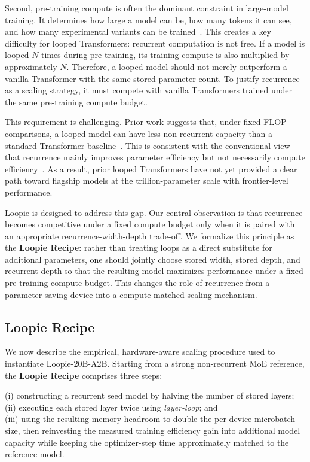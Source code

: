 Second, pre-training compute is often the dominant constraint in large-model training. It determines how large a model can be, how many tokens it can see, and how many experimental variants can be trained~\citep{kaplan2020scaling,hoffmann2022training}. This creates a key difficulty for looped Transformers: recurrent computation is not free. If a model is looped $N$ times during pre-training, its training compute is also multiplied by approximately $N$. Therefore, a looped model should not merely outperform a vanilla Transformer with the same stored parameter count. To justify recurrence as a scaling strategy, it must compete with vanilla Transformers trained under the same pre-training compute budget.

This requirement is challenging. Prior work suggests that, under fixed-FLOP comparisons, a looped model can have less non-recurrent capacity than a standard Transformer baseline~\citep{csordas2024moeut,frey2026dualpath}. This is consistent with the conventional view that recurrence mainly improves parameter efficiency but not necessarily compute efficiency~\citep{lan2019albert,takase2023lessons}. As a result, prior looped Transformers have not yet provided a clear path toward flagship models at the trillion-parameter scale with frontier-level performance.

Loopie is designed to address this gap. Our central observation is that recurrence becomes competitive under a fixed compute budget only when it is paired with an appropriate recurrence-width-depth trade-off. We formalize this principle as the \textbf{Loopie Recipe}: rather than treating loops as a direct substitute for additional parameters, one should jointly choose stored width, stored depth, and recurrent depth so that the resulting model maximizes performance under a fixed pre-training compute budget. This changes the role of recurrence from a parameter-saving device into a compute-matched scaling mechanism.

\subsection{Loopie Recipe}
\label{subsec:loopie-recipe}

We now describe the empirical, hardware-aware scaling procedure used to
instantiate Loopie-20B-A2B. Starting from a strong non-recurrent MoE
reference, the \textbf{Loopie Recipe} comprises three steps:
\begin{tcolorbox}[colback=blue!4,colframe=blue!35!black,boxrule=0.5pt,arc=4pt,left=6pt,right=6pt,top=5pt,bottom=5pt]
(i) constructing a recurrent seed model by halving the number of stored layers; \\
(ii) executing each stored layer twice using \textit{layer-loop}; and \\
(iii) using the resulting memory headroom to double the per-device
microbatch size, then reinvesting the measured training efficiency gain
into additional model capacity while keeping the optimizer-step time
approximately matched to the reference model.
\end{tcolorbox}

